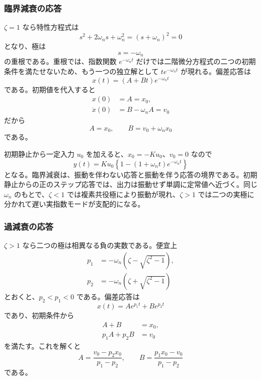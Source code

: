 \subsubsection{臨界減衰の応答}
$\zeta=1$ なら特性方程式は
\begin{equation}
  s^2+2\omega_n s+\omega_n^2=(s+\omega_n)^2=0
\end{equation}
となり、極は
\begin{equation}
  s=-\omega_n
\end{equation}
の重根である。重根では、指数関数 $e^{-\omega_n t}$ だけでは二階微分方程式の二つの初期条件を満たせないため、もう一つの独立解として $t e^{-\omega_n t}$ が現れる。偏差応答は
\begin{equation}
  x(t)=(A+Bt)e^{-\omega_n t}
  \label{eq:second-order-critical-free}
\end{equation}
である。初期値を代入すると
\begin{align}
  x(0)&=A=x_0,\\
  \dot{x}(0)&=B-\omega_n A=v_0
\end{align}
だから
\begin{equation}
  A=x_0,\qquad
  B=v_0+\omega_n x_0
  \label{eq:second-order-critical-constants}
\end{equation}
である。

初期静止から一定入力 $u_0$ を加えると、$x_0=-K u_0$、$v_0=0$ なので
\begin{equation}
  y(t)=K u_0\left\{1-(1+\omega_n t)e^{-\omega_n t}\right\}
  \label{eq:second-order-critical-step}
\end{equation}
となる。臨界減衰は、振動を伴わない応答と振動を伴う応答の境界である。初期静止からの正のステップ応答では、出力は振動せず単調に定常値へ近づく。同じ $\omega_n$ のもとで、$\zeta<1$ では複素共役極により振動が現れ、$\zeta>1$ では二つの実極に分かれて遅い実指数モードが支配的になる。

\subsubsection{過減衰の応答}
$\zeta>1$ なら二つの極は相異なる負の実数である。便宜上
\begin{align}
  p_1&=-\omega_n\left(\zeta-\sqrt{\zeta^2-1}\right),\\
  p_2&=-\omega_n\left(\zeta+\sqrt{\zeta^2-1}\right)
\end{align}
とおくと、$p_2<p_1<0$ である。偏差応答は
\begin{equation}
  x(t)=A e^{p_1t}+B e^{p_2t}
  \label{eq:second-order-overdamped-free}
\end{equation}
であり、初期条件から
\begin{align}
  A+B&=x_0,\\
  p_1A+p_2B&=v_0
\end{align}
を満たす。これを解くと
\begin{equation}
  A=\frac{v_0-p_2x_0}{p_1-p_2},\qquad
  B=\frac{p_1x_0-v_0}{p_1-p_2}
  \label{eq:second-order-overdamped-constants}
\end{equation}
である。

